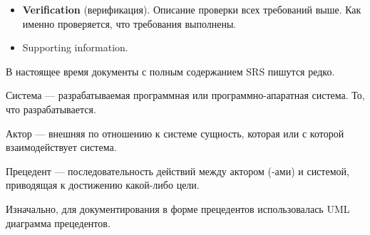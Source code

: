 \begin{Def}
\begin{itemize}
            \item \textbf{Verification} (верификация). Описание проверки всех требований выше. Как именно проверяется, что требования выполнены.

            \item Supporting information.
        \end{itemize}
    \end{Def}

    \begin{Rem}
        В настоящее время документы с полным содержанием SRS пишутся редко.
    \end{Rem}


    \begin{Def}[Система]
        Система --- разрабатываемая программная или программно-апаратная система. То, что разрабатывается.
    \end{Def}

    \begin{Def}[Актор]
        Актор --- внешняя по отношению к системе сущность, которая или с которой взаимодействует система.
    \end{Def}

    \begin{Def}[Прецедент]
        Прецедент --- последовательность действий между актором (-ами) и системой, приводящая к достижению какой-либо цели.
    \end{Def}

    \begin{Rem}
        Изначально, для документирования в форме прецедентов использовалась UML диаграмма прецедентов.
    \end{Rem}

